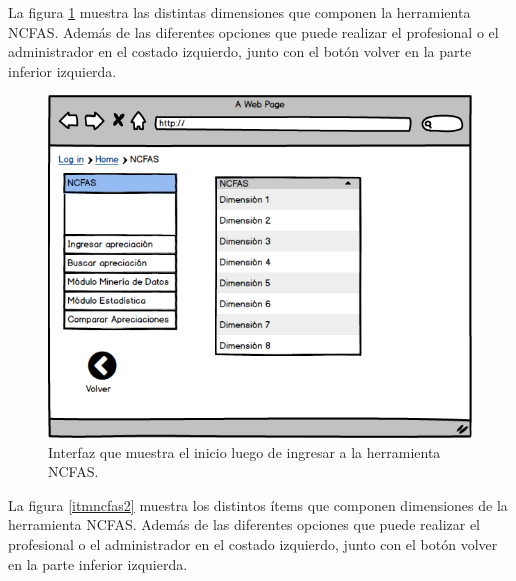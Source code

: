 \clearpage
\newpage

La figura \ref{dimncfas} muestra las distintas dimensiones que componen la herramienta NCFAS. 
Además de las diferentes opciones que puede realizar el profesional o el administrador en el costado izquierdo, junto con el botón volver en la parte inferior izquierda.\\

\begin{figure}[htb]
	\label{dimncfas}
	\begin{center}
		\includegraphics[scale=0.5]{imagenes/dimncfas.png}
	\end{center}
	\caption{Interfaz que muestra el inicio luego de ingresar a la herramienta NCFAS.}
\end{figure}

\clearpage
\newpage

La figura \ref{itmncfas2} muestra los distintos ítems que componen dimensiones de la herramienta NCFAS. 
Además de las diferentes opciones que puede realizar el profesional o el administrador en el costado izquierdo, junto con el botón volver en la parte inferior izquierda.\\

